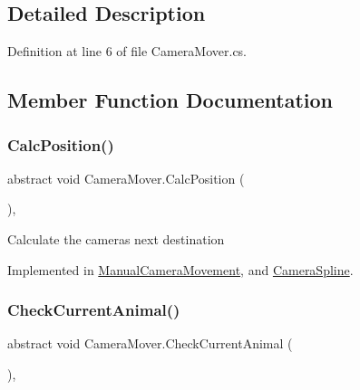 \subsection{Detailed Description}


Definition at line 6 of file Camera\+Mover.\+cs.



\subsection{Member Function Documentation}
\mbox{\label{class_camera_mover_afe44c2188d44a3fdb72acdf0d12563a9}} 
\subsubsection{\texorpdfstring{Calc\+Position()}{CalcPosition()}}
{\footnotesize\ttfamily abstract void Camera\+Mover.\+Calc\+Position (\begin{DoxyParamCaption}{ }\end{DoxyParamCaption})\hspace{0.3cm}{\ttfamily [protected]}, {}}



Calculate the camera\textquotesingle{}s next destination 



Implemented in \mbox{\hyperlink{class_manual_camera_movement_af39bcaa57f616ec5003c1848deefb087}{Manual\+Camera\+Movement}}, and \mbox{\hyperlink{class_camera_spline_a70ec10306e6894532589d3d1dffaa3ae}{Camera\+Spline}}.

\mbox{\label{class_camera_mover_ae1a5b4f8f531adf79cdea73c27ca8203}} 
\subsubsection{\texorpdfstring{Check\+Current\+Animal()}{CheckCurrentAnimal()}}
{\footnotesize\ttfamily abstract void Camera\+Mover.\+Check\+Current\+Animal (\begin{DoxyParamCaption}{ }\end{DoxyParamCaption})\hspace{0.3cm}{\ttfamily [protected]}, {}}



